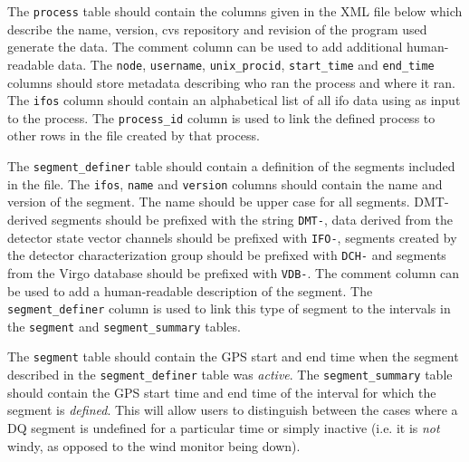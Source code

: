The \verb|process| table should contain the columns given in the XML
file below which describe the name, version, cvs repository and
revision of the program used generate the data. The comment column can
be used to add additional human-readable data. The \verb|node|,
\verb|username|,
\verb|unix_procid|, \verb|start_time| and \verb|end_time| columns should store metadata
describing who ran the process and where it ran. The \verb|ifos| column
should contain an alphabetical list of all ifo data using as input to
the process. The \verb|process_id| column is used to link the defined
process to other rows in the file created by that process.

The \verb|segment_definer| table should contain a definition of the
segments included in the file. The \verb|ifos|, \verb|name| and
\verb|version| columns should contain the name and version of the
segment. The name should be upper case for all segments. DMT-derived
segments should be prefixed with the string \verb|DMT-|, data derived
from the detector state vector channels should be prefixed with
\verb|IFO-|, segments created by the detector characterization group
should be prefixed with \verb|DCH-| and segments from the Virgo
database should be prefixed with \verb|VDB-|.  The comment column can
be used to add a human-readable description of the segment. The
\verb|segment_definer| column is used to link this type of segment to
the intervals in the \verb|segment| and \verb|segment_summary| tables.

The \verb|segment| table should contain the GPS start and end time
when the segment described in the \verb|segment_definer| table was
\emph{active}. The \verb|segment_summary| table should contain the GPS
start time and end time of the interval for which the segment is
\emph{defined}. This will allow users to distinguish between the cases
where a DQ segment is undefined for a particular time or simply
inactive (i.e. it is \emph{not} windy, as opposed to the wind monitor
being down).


